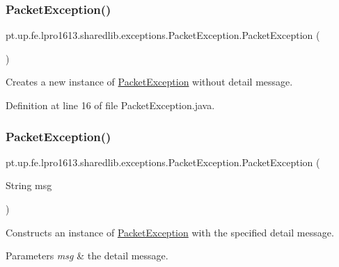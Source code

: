 \subsubsection{\texorpdfstring{Packet\+Exception()}{PacketException()}\hspace{0.1cm}{\footnotesize\ttfamily [1/4]}}
{\footnotesize\ttfamily pt.\+up.\+fe.\+lpro1613.\+sharedlib.\+exceptions.\+Packet\+Exception.\+Packet\+Exception (\begin{DoxyParamCaption}{ }\end{DoxyParamCaption})}

Creates a new instance of {\ttfamily \hyperlink{classpt_1_1up_1_1fe_1_1lpro1613_1_1sharedlib_1_1exceptions_1_1_packet_exception}{Packet\+Exception}} without detail message. 

Definition at line 16 of file Packet\+Exception.\+java.

\hypertarget{classpt_1_1up_1_1fe_1_1lpro1613_1_1sharedlib_1_1exceptions_1_1_packet_exception_a8710c289a2dd416a1ad7d25248021f9d}{}\label{classpt_1_1up_1_1fe_1_1lpro1613_1_1sharedlib_1_1exceptions_1_1_packet_exception_a8710c289a2dd416a1ad7d25248021f9d} 
\subsubsection{\texorpdfstring{Packet\+Exception()}{PacketException()}\hspace{0.1cm}{\footnotesize\ttfamily [2/4]}}
{\footnotesize\ttfamily pt.\+up.\+fe.\+lpro1613.\+sharedlib.\+exceptions.\+Packet\+Exception.\+Packet\+Exception (\begin{DoxyParamCaption}\item[{String}]{msg }\end{DoxyParamCaption})}

Constructs an instance of {\ttfamily \hyperlink{classpt_1_1up_1_1fe_1_1lpro1613_1_1sharedlib_1_1exceptions_1_1_packet_exception}{Packet\+Exception}} with the specified detail message.


\begin{DoxyParams}{Parameters}
{\em msg} & the detail message. \\
\hline
\end{DoxyParams}


